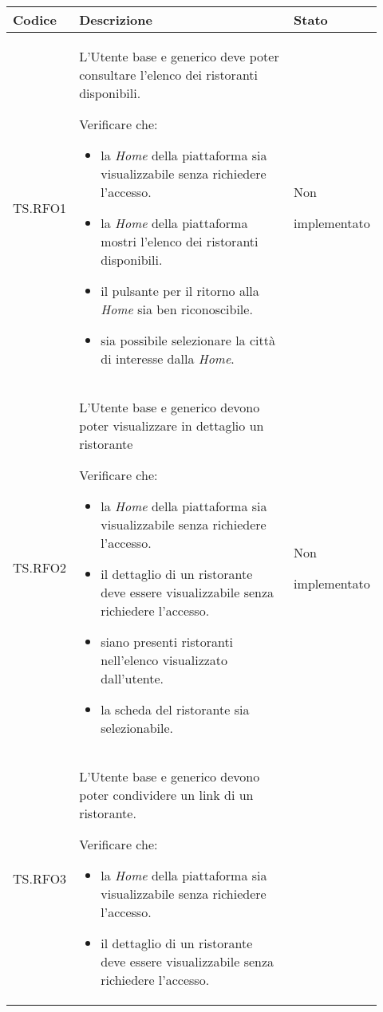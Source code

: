 \fontsize{10}{12}\selectfont
\begin{longtable}{|p{0.10\linewidth}|p{0.70\linewidth}|p{0.12\linewidth}|}
    \hline
	\textbf{Codice} & \textbf{Descrizione} & \textbf{Stato} \\
    \hline
    TS.RFO1 & 
    L'Utente base e generico deve poter consultare l'elenco dei ristoranti disponibili. \par 
    Verificare che: 
    \begin{itemize}
        \item la \textit{Home} della piattaforma sia visualizzabile senza richiedere l'accesso.
        \item la \textit{Home} della piattaforma mostri l'elenco dei ristoranti disponibili.
        \item il pulsante per il ritorno alla \textit{Home} sia ben riconoscibile.
        \item sia possibile selezionare la città di interesse dalla \textit{Home}.
    \end{itemize}&
    Non \par implementato \\
    \hline
    TS.RFO2 & 
    L'Utente base e generico devono poter visualizzare in dettaglio un ristorante \par 
    Verificare che: 
    \begin{itemize}
        \item la \textit{Home} della piattaforma sia visualizzabile senza richiedere l'accesso.
        \item il dettaglio di un ristorante deve essere visualizzabile senza richiedere l'accesso.
        \item siano presenti ristoranti nell'elenco visualizzato dall'utente.
        \item la scheda del ristorante sia selezionabile.
    \end{itemize}&
    Non \par implementato  \\
    \hline
    TS.RFO3 & 
    L'Utente base e generico devono poter condividere un link di un ristorante. \par 
    Verificare che: 
    \begin{itemize}
        \item la \textit{Home} della piattaforma sia visualizzabile senza richiedere l'accesso.
        \item il dettaglio di un ristorante deve essere visualizzabile senza richiedere l'accesso.

\end{itemize}
\end{longtable}
